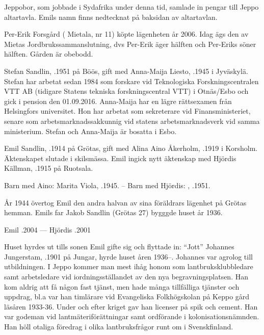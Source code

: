 Jeppobor, som jobbade i Sydafrika under denna tid, samlade in pengar till Jeppo altartavla. Emils namn finns nedtecknat på baksidan av altartavlan.






Per-Erik Forsgård ( Mietala, nr 11) köpte lägenheten år 2006. Idag ägs den av Mietas Jordbrukssammanslutning, dvs Per-Erik äger hälften och Per-Eriks söner hälften. Gården är obebodd.\jhvspace{}


Stefan Sandlin, .1951 på Böös, gift med Anna-Maija Liesto, .1945 i Jyväskylä. Stefan har arbetat sedan 1984 som forskare vid Teknologiska Forskningscentralen VTT AB (tidigare Statens tekniska forskningscentral VTT) i Otnäs/Esbo och gick i pension den 01.09.2016. Anna-Maija har en lägre rättsexamen från Helsingfors universitet. Hon har arbetat som sekreterare vid Finansministeriet, senare som arbetsmarknadssakkunnig vid statens arbetsmarknadsverk vid samma ministerium. Stefan och Anna-Maija är bosatta i Esbo.


Emil Sandlin, .1914 på Grötas, gift med Alina Aino Åkerholm, .1919 i Korsholm. Äktenskapet slutade i skilsmässa. Emil ingick nytt äktenskap med Hjördis Källman, .1915 på Ruotsala.

Barn med Aino: Marita Viola, .1945. -- Barn med Hjördis: , .1951.

År 1944 övertog Emil den andra halvan av sina föräldrars lägenhet på Grötas hemman. Emils far Jakob Sandlin (Grötas 27) bygggde huset 			 år 1936.

Emil .2004  ---  Hjördis .2001


Huset hyrdes ut tills sonen Emil gifte sig och flyttade in: ``Jott'' Johannes Jungerstam, .1901 på Jungar, hyrde huset åren 1936--. Johannes var agrolog till utbildningen. I Jeppo kommer man mest ihåg honom som lantbruksklubbledare samt arbetsledare vid iordningsställandet av den nya begravningsplatsen. Han kom aldrig att få någon fast tjänst, men hade många tillfälliga tjänster och uppdrag, bl.a var han timlärare vid Evangeliska Folkhögskolan på Keppo gård läsåren 1933-36. Under och efter kriget gav han licenser på spik och cement. Han var godeman vid lantmäteriförättningar samt ordförande i kolonisationsnämnden. Han höll otaliga föredrag i olika lantbruksfrågor runt om i Svenskfinland.

